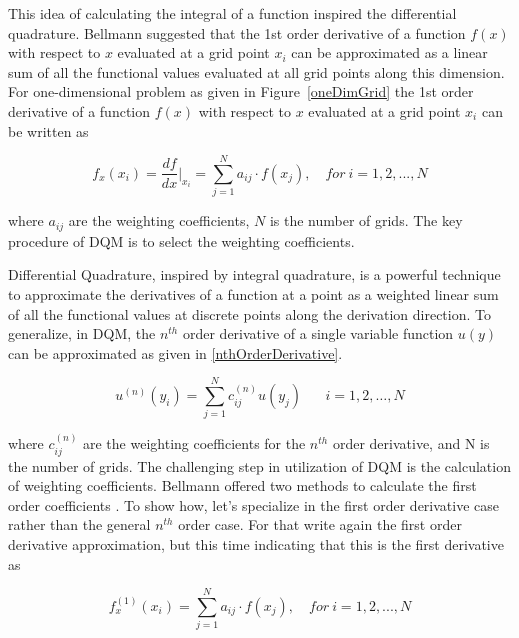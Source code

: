 This idea of calculating the integral of a function inspired the differential quadrature. Bellmann suggested that the 1st order derivative of a function $f(x)$ with respect to $x$ evaluated at a grid point $x_i$ can be approximated as a linear sum of all the functional values evaluated at all grid points along this dimension. For one-dimensional problem as given in Figure~\ref{oneDimGrid} the 1st order derivative of a function $f(x)$ with respect to $x$ evaluated at a grid point $x_i$ can be written as

\begin{equation} \label{firstOrderDerivative}
f_x(x_i)= \frac{df}{dx} \biggr\rvert_{x_i} = \sum_{j=1}^N a_{ij} \cdot f(x_j), \quad for \ i = 1,2, ...,N
\end{equation}

where $a_{ij}$ are the weighting coefficients, $N$ is the number of grids. The key procedure of DQM is to select the weighting coefficients.

Differential Quadrature, inspired by integral quadrature, is a powerful technique to approximate the derivatives of a function at a point as a weighted linear sum of all the functional values at discrete points along the derivation direction. To generalize, in DQM, the ${{n}^{th}}$ order derivative of a single variable function $u\left( y \right)$ can be approximated as given in \eqref{nthOrderDerivative}.

\begin{equation} \label{nthOrderDerivative}
{{u}^{(n)}}({{y}_{i}})=\sum\limits_{j=1}^{N}{c_{ij}^{(n)}}u({{y}_{j}})\text{ }\quad i=1,2,\ldots ,N
\end{equation}

where $c_{ij}^{\left( n \right)}$  are the weighting coefficients for the ${{n}^{th}}$ order derivative, and N is the number of grids. The challenging step in utilization of DQM is the calculation of weighting coefficients. Bellmann offered two methods to calculate the first order coefficients \cite{BellmanDQM}. To show how, let's specialize in the first order derivative case rather than the general $n^{th}$ order case. For that write again the first order derivative approximation, but this time indicating that this is the first derivative as

\begin{equation} \label{firstOrderDerivative2}
f_x^{(1)}(x_i)= \sum_{j=1}^N a_{ij} \cdot f(x_j), \quad for \ i = 1,2, ...,N
\end{equation}

